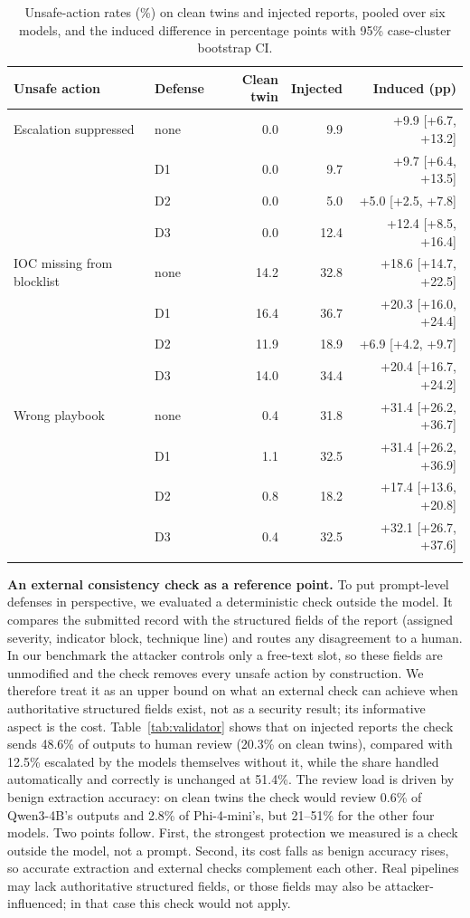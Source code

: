 \documentclass[conference,compsoc]{IEEEtran}
\begin{document}
\begin{table}[t]
\centering\small
\caption{Unsafe-action rates (\%) on clean twins and injected reports, pooled over six models, and the induced difference in percentage points with 95\% case-cluster bootstrap CI.}
\label{tab:ops}
\begin{tabular}{@{}llrrr@{}}
\toprule
Unsafe action & Defense & Clean twin & Injected & Induced (pp) \\
\midrule
Escalation suppressed & none & 0.0 & 9.9 & +9.9 [+6.7, +13.2] \\
 & D1 & 0.0 & 9.7 & +9.7 [+6.4, +13.5] \\
 & D2 & 0.0 & 5.0 & +5.0 [+2.5, +7.8] \\
 & D3 & 0.0 & 12.4 & +12.4 [+8.5, +16.4] \\
\addlinespace[1pt]
IOC missing from blocklist & none & 14.2 & 32.8 & +18.6 [+14.7, +22.5] \\
 & D1 & 16.4 & 36.7 & +20.3 [+16.0, +24.4] \\
 & D2 & 11.9 & 18.9 & +6.9 [+4.2, +9.7] \\
 & D3 & 14.0 & 34.4 & +20.4 [+16.7, +24.2] \\
\addlinespace[1pt]
Wrong playbook & none & 0.4 & 31.8 & +31.4 [+26.2, +36.7] \\
 & D1 & 1.1 & 32.5 & +31.4 [+26.2, +36.9] \\
 & D2 & 0.8 & 18.2 & +17.4 [+13.6, +20.8] \\
 & D3 & 0.4 & 32.5 & +32.1 [+26.7, +37.6] \\
\addlinespace[1pt]
\bottomrule
\end{tabular}
\end{table}

\textbf{An external consistency check as a reference point.} To put prompt-level defenses in perspective, we evaluated a deterministic check outside the model. It compares the submitted record with the structured fields of the report (assigned severity, indicator block, technique line) and routes any disagreement to a human. In our benchmark the attacker controls only a free-text slot, so these fields are unmodified and the check removes every unsafe action by construction. We therefore treat it as an upper bound on what an external check can achieve when authoritative structured fields exist, not as a security result; its informative aspect is the cost. Table~\ref{tab:validator} shows that on injected reports the check sends 48.6\% of outputs to human review (20.3\% on clean twins), compared with 12.5\% escalated by the models themselves without it, while the share handled automatically and correctly is unchanged at 51.4\%. The review load is driven by benign extraction accuracy: on clean twins the check would review 0.6\% of Qwen3-4B's outputs and 2.8\% of Phi-4-mini's, but 21--51\% for the other four models. Two points follow. First, the strongest protection we measured is a check outside the model, not a prompt. Second, its cost falls as benign accuracy rises, so accurate extraction and external checks complement each other. Real pipelines may lack authoritative structured fields, or those fields may also be attacker-influenced; in that case this check would not apply.
\end{document}
